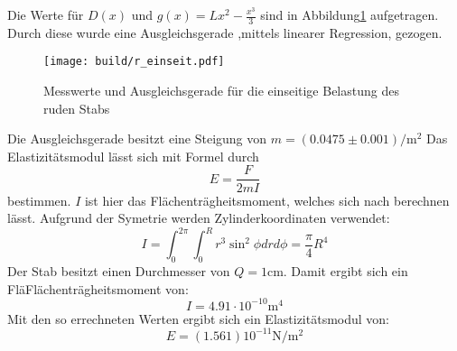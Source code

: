 Die Werte für $D(x)$ und $g(x)=Lx^2-\frac{x^3}{3}$ sind in Abbildung\ref{fig:plot1} aufgetragen.
Durch diese wurde eine Ausgleichsgerade ,mittels linearer Regression, gezogen.
\begin{figure}
    \centering
    \texttt{[image: build/r\_einseit.pdf]}
    \caption{Messwerte und Ausgleichsgerade für die einseitige Belastung des ruden Stabs}
    \label{fig:plot1}
\end{figure}

Die Ausgleichsgerade besitzt eine Steigung von $m=(0.0475\pm 0.001)\si{\per\meter\squared}$
Das Elastizitätsmodul lässt sich mit Formel durch
\begin{equation}
  E=\frac{F}{2mI}
\end{equation}
bestimmen.
$I$ ist hier das Flächenträgheitsmoment, welches sich nach berechnen lässt.
Aufgrund der Symetrie werden Zylinderkoordinaten verwendet:
\begin{equation}
  I=\int_0^{2\pi} \int_0^R r^3 \sin^2{\phi} dr d\phi=\frac{\pi}{4}R^4
\end{equation}
Der Stab besitzt einen Durchmesser von $Q=1\si{\centi\meter}$.
Damit ergibt sich ein FläFlächenträgheitsmoment von:
\begin{equation*}
  I=4.91\cdot 10^{-10} \si{\meter}^4
\end{equation*}
Mit den so errechneten Werten ergibt sich ein Elastizitätsmodul von:
\begin{equation*}
  E=(1.561)10^{-11}\si{\newton\per\meter\squared}
\end{equation*}
